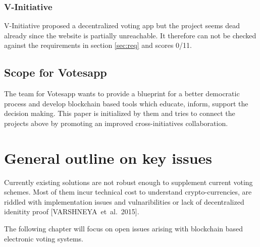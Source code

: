 \documentclass[9pt,oneside]{amsart}
\begin{document}
\begin{multicols}{2}
\subsubsection{V-Initiative}
V-Initiative proposed a decentralized voting app but the project seems dead already since the website is partially unreachable. It therefore can not be checked against the requirements in section \ref{sec:req} and scores 0/11.

\subsection{Scope for Votesapp}
The team for Votesapp wants to provide a blueprint for a better democratic process and develop blockchain based tools which educate, inform, support the decision making. This paper is initialized by them and tries to connect the projects above by promoting an improved cross-initiatives collaboration.

\section{General outline on key issues}
Currently existing solutions are not robust enough to supplement current voting schemes. Most of them incur technical cost to understand crypto-currencies, are riddled with implementation issues and vulnaribilities or lack of decentralized idenitity proof [VARSHNEYA~et~al.~2015].\par
The following chapter will focus on open issues arising with blockchain based electronic voting systems.


\end{multicols}
\end{document}
